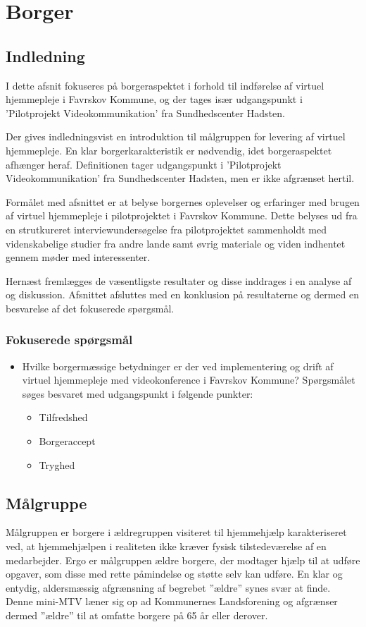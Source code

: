 \chapter{Borger}

\section{Indledning}
I dette afsnit fokuseres på borgeraspektet i forhold til indførelse af virtuel hjemmepleje i Favrskov Kommune, og der tages især udgangspunkt i ’Pilotprojekt Videokommunikation’ fra Sundhedscenter Hadsten. 

Der gives indledningsvist en introduktion til målgruppen for levering af virtuel hjemmepleje. En klar borgerkarakteristik er nødvendig, idet borgeraspektet afhænger heraf. Definitionen tager udgangspunkt i ’Pilotprojekt Videokommunikation’ fra Sundhedscenter Hadsten, men er ikke afgrænset hertil. 

Formålet med afsnittet er at belyse borgernes oplevelser og erfaringer med brugen af virtuel hjemmepleje i pilotprojektet i Favrskov Kommune. Dette belyses ud fra en strutkureret interviewundersøgelse fra pilotprojektet sammenholdt med videnskabelige studier fra andre lande samt øvrig materiale og viden indhentet gennem møder med interessenter.

Hernæst fremlægges de væsentligste resultater og disse inddrages i en analyse af og diskussion. Afsnittet afsluttes med en konklusion på resultaterne og dermed en besvarelse af det fokuserede spørgsmål.



\subsection{Fokuserede spørgsmål}
\begin{itemize}
	\item Hvilke borgermæssige betydninger er der ved implementering og drift af virtuel hjemmepleje med videokonference i Favrskov Kommune? Spørgsmålet søges besvaret med udgangspunkt i følgende punkter:
	\begin{itemize}
	\item Tilfredshed
	\item Borgeraccept
	\item Tryghed
\end{itemize}
\end{itemize}

\section{Målgruppe}
Målgruppen er borgere i ældregruppen visiteret til hjemmehjælp karakteriseret ved, at hjemmehjælpen i realiteten ikke kræver fysisk tilstedeværelse af en medarbejder. Ergo er målgruppen ældre borgere, der modtager hjælp til at udføre opgaver, som disse med rette påmindelse og støtte selv kan udføre. En klar og entydig, aldersmæssig afgrænsning af begrebet ”ældre” synes svær at finde. Denne mini-MTV læner sig op ad Kommunernes Landsforening og afgrænser dermed ”ældre” til at omfatte borgere på 65 år eller derover\cite{KL}. 

